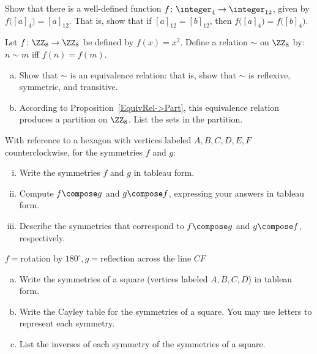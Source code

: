 \begin{exercise}{57}
Show that there is a well-defined function 
$f \colon \integer_4 \to \integer_{12}$, given by \\
$ f \bigl( [a]_4 \bigr) = [a]_{12}$. 
That is, show that if $[a]_{12} = [b]_{12}$, then $f \bigl( [a]_4 \bigr) = f \bigl( [b]_4 \bigr)$.
\end{exercise}

\begin{exercise}{66}
Let $f\colon \ZZ_8 \to \ZZ_8$ be defined by $f(x) =  x^2 $. Define a relation $\sim$ on $\ZZ_8$ by: $n \sim m$ iff $f(n) = f(m)$.
\begin{enumerate}[(a)]
\item
Show that $\sim$ is an equivalence relation: that is, show that $\sim$ is reflexive, symmetric, and transitive.
\item
According to Proposition~\ref{EquivRel->Part}, this equivalence relation produces a partition on  $\ZZ_8$. List the sets in the partition.
\end{enumerate}
\end{exercise}

\begin{exercise}{16}
With reference to a hexagon with vertices labeled $A,B,C,D,E,F$ counterclockwise, for the symmetries $f$ and $g$:
\begin{enumerate}[(i)]
\item
Write the symmetries $f$ and $g$ in tableau form.
\item
Compute $f \compose g$ and $g \compose f$, expressing your answers in tableau form.
\item 
Describe the symmetries that correspond to $f \compose g$ and $g \compose f$, respectively.
\end{enumerate}
\medskip
$f=$rotation by $ 180^\circ, g=$reflection across the line $CF$
\end{exercise}

\bigskip
\begin{exercise}{}
\begin{enumerate}[(a)]
\item
Write the symmetries of a square (vertices labeled $A,B,C,D$) in tableau form.
\item
Write the Cayley table for the symmetries of a square. You may use letters to represent each symmetry. 
\item
List the inverses of each symmetry of the symmetries of a square.
\end{enumerate}
\end{exercise}


